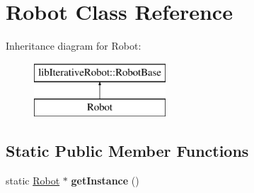 \hypertarget{class_robot}{}\section{Robot Class Reference}
\label{class_robot}
Inheritance diagram for Robot\+:\begin{figure}[H]
\begin{center}
\leavevmode
\includegraphics[height=2.000000cm]{class_robot}
\end{center}
\end{figure}
\subsection*{Static Public Member Functions}
\begin{DoxyCompactItemize}
\item 
\mbox{\label{class_robot_ac6f19dc31b435f8a2d43944ba49286d0}} 
static \mbox{\hyperlink{class_robot}{Robot}} $\ast$ {\bfseries get\+Instance} ()
\end{DoxyCompactItemize}
